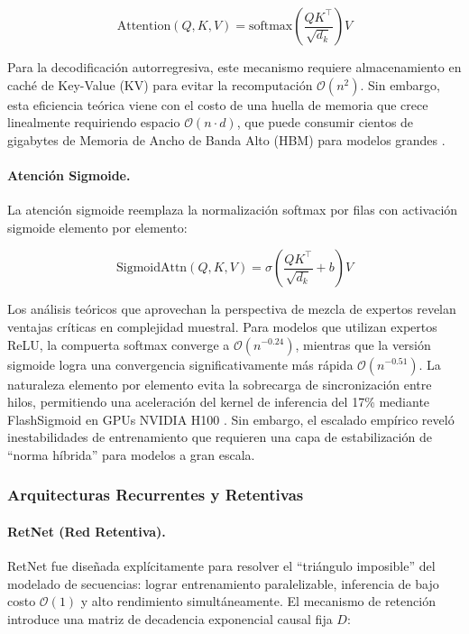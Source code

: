 \documentclass[11pt,a4paper]{article}
\begin{document}
$$
\text{Attention}(Q,K,V) = \text{softmax}\left(\frac{QK^\top}{\sqrt{d_k}}\right)V
$$

Para la decodificación autorregresiva, este mecanismo requiere almacenamiento en caché de Key-Value (KV) para evitar la recomputación $\mathcal{O}(n^2)$. Sin embargo, esta eficiencia teórica viene con el costo de una huella de memoria que crece linealmente requiriendo espacio $\mathcal{O}(n \cdot d)$, que puede consumir cientos de gigabytes de Memoria de Ancho de Banda Alto (HBM) para modelos grandes \citep{vaswani_attention_2017}.

\paragraph{Atención Sigmoide.}
La atención sigmoide reemplaza la normalización softmax por filas con activación sigmoide elemento por elemento:

$$
\text{SigmoidAttn}(Q,K,V) = \sigma\left(\frac{QK^\top}{\sqrt{d_k}}+b\right)V
$$

Los análisis teóricos que aprovechan la perspectiva de mezcla de expertos revelan ventajas críticas en complejidad muestral. Para modelos que utilizan expertos ReLU, la compuerta softmax converge a $\mathcal{O}(n^{-0.24})$, mientras que la versión sigmoide logra una convergencia significativamente más rápida $\mathcal{O}(n^{-0.51})$. La naturaleza elemento por elemento evita la sobrecarga de sincronización entre hilos, permitiendo una aceleración del kernel de inferencia del 17\% mediante FlashSigmoid en GPUs NVIDIA H100 \citep{ramapuram_theory_2024}. Sin embargo, el escalado empírico reveló inestabilidades de entrenamiento que requieren una capa de estabilización de ``norma híbrida'' para modelos a gran escala.

\subsubsection{Arquitecturas Recurrentes y Retentivas}

\paragraph{RetNet (Red Retentiva).}
RetNet fue diseñada explícitamente para resolver el ``triángulo imposible'' del modelado de secuencias: lograr entrenamiento paralelizable, inferencia de bajo costo $\mathcal{O}(1)$ y alto rendimiento simultáneamente. El mecanismo de retención introduce una matriz de decadencia exponencial causal fija $D$:
\end{document}
